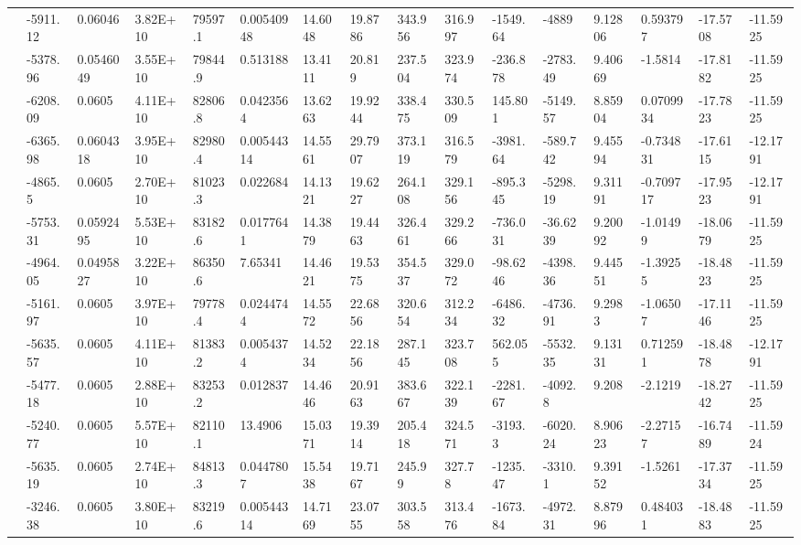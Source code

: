 \documentclass[paper=a4, fontsize=11pt]{scrartcl}
\numberwithin{equation}{section}
\numberwithin{figure}{section}
\numberwithin{table}{section}
\begin{document}
{{\begin{tabular}{l || l | l | l | l | l | l | l | l | l | l | l | l | l | l | l}
    & -5911.12 & 0.06046 & 3.82E+10 & 79597.1 & 0.00540948 & 14.6048 & 19.8786 & 343.956 & 316.997 & -1549.64 & -4889 & 9.12806 & 0.593797 & -17.5708 & -11.5925 \\
    & -5378.96 & 0.0546049 & 3.55E+10 & 79844.9 & 0.513188 & 13.4111 & 20.819 & 237.504 & 323.974 & -236.878 & -2783.49 & 9.40669 & -1.5814 & -17.8182 & -11.5925 \\
    & -6208.09 & 0.0605 & 4.11E+10 & 82806.8 & 0.0423564 & 13.6263 & 19.9244 & 338.475 & 330.509 & 145.801 & -5149.57 & 8.85904 & 0.0709934 & -17.7823 & -11.5925 \\
    & -6365.98 & 0.0604318 & 3.95E+10 & 82980.4 & 0.00544314 & 14.5561 & 29.7907 & 373.119 & 316.579 & -3981.64 & -589.742 & 9.45594 & -0.734831 & -17.6115 & -12.1791 \\
    & -4865.5 & 0.0605 & 2.70E+10 & 81023.3 & 0.022684 & 14.1321 & 19.6227 & 264.108 & 329.156 & -895.345 & -5298.19 & 9.31191 & -0.709717 & -17.9523 & -12.1791 \\
    & -5753.31 & 0.0592495 & 5.53E+10 & 83182.6 & 0.0177641 & 14.3879 & 19.4463 & 326.461 & 329.266 & -736.031 & -36.6239 & 9.20092 & -1.01499 & -18.0679 & -11.5925 \\
    & -4964.05 & 0.0495827 & 3.22E+10 & 86350.6 & 7.65341 & 14.4621 & 19.5375 & 354.537 & 329.072 & -98.6246 & -4398.36 & 9.44551 & -1.39255 & -18.4823 & -11.5925 \\
    & -5161.97 & 0.0605 & 3.97E+10 & 79778.4 & 0.0244744 & 14.5572 & 22.6856 & 320.654 & 312.234 & -6486.32 & -4736.91 & 9.2983 & -1.06507 & -17.1146 & -11.5925 \\
    & -5635.57 & 0.0605 & 4.11E+10 & 81383.2 & 0.0054374 & 14.5234 & 22.1856 & 287.145 & 323.708 & 562.055 & -5532.35 & 9.13131 & 0.712591 & -18.4878 & -12.1791 \\
    & -5477.18 & 0.0605 & 2.88E+10 & 83253.2 & 0.012837 & 14.4646 & 20.9163 & 383.667 & 322.139 & -2281.67 & -4092.8 & 9.208 & -2.1219 & -18.2742 & -11.5925 \\
    & -5240.77 & 0.0605 & 5.57E+10 & 82110.1 & 13.4906 & 15.0371 & 19.3914 & 205.418 & 324.571 & -3193.3 & -6020.24 & 8.90623 & -2.27157 & -16.7489 & -11.5924 \\
    & -5635.19 & 0.0605 & 2.74E+10 & 84813.3 & 0.0447807 & 15.5438 & 19.7167 & 245.99 & 327.78 & -1235.47 & -3310.1 & 9.39152 & -1.5261 & -17.3734 & -11.5925 \\
    & -3246.38 & 0.0605 & 3.80E+10 & 83219.6 & 0.00544314 & 14.7169 & 23.0755 & 303.558 & 313.476 & -1673.84 & -4972.31 & 8.87996 & 0.484031 & -18.4883 & -11.5925 \\

\end{tabular}}}
\end{document}
